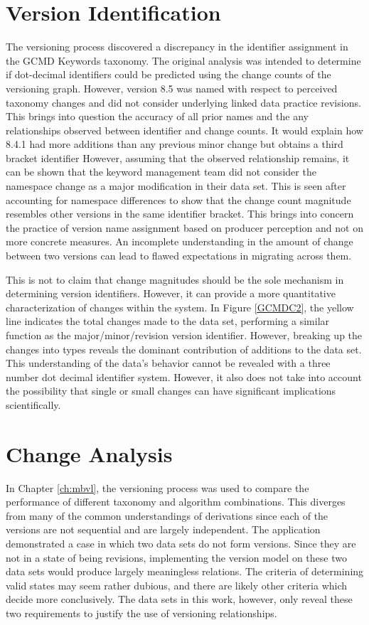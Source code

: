 \section{Version Identification}

The versioning process discovered a discrepancy in the identifier assignment in the GCMD Keywords taxonomy.
The original analysis was intended to determine if dot-decimal identifiers could be predicted using the change counts of the versioning graph.
However, version 8.5 was named with respect to perceived taxonomy changes and did not consider underlying linked data practice revisions.
This brings into question the accuracy of all prior names and the any relationships observed between identifier and change counts.
It would explain how 8.4.1 had more additions than any previous minor change but obtains a third bracket identifier
However, assuming that the observed relationship remains, it can be shown that the keyword management team did not consider the namespace change as a major modification in their data set.
This is seen after accounting for namespace differences to show that the change count magnitude resembles other versions in the same identifier bracket.
This brings into concern the practice of version name assignment based on producer perception and not on more concrete measures.
An incomplete understanding in the amount of change between two versions can lead to flawed expectations in migrating across them.

This is not to claim that change magnitudes should be the sole mechanism in determining version identifiers.
However, it can provide a more quantitative characterization of changes within the system.
In Figure \ref{GCMDC2}, the yellow line indicates the total changes made to the data set, performing a similar function as the major/minor/revision version identifier.
However, breaking up the changes into types reveals the dominant contribution of additions to the data set.
This understanding of the data's behavior cannot be revealed with a three number dot decimal identifier system.
However, it also does not take into account the possibility that single or small changes can have significant implications scientifically.

\section{Change Analysis}

In Chapter \ref{ch:mbvl}, the versioning process was used to compare the performance of different taxonomy and algorithm combinations.
This diverges from many of the common understandings of derivations since each of the versions are not sequential and are largely independent.
The application demonstrated a case in which two data sets do not form versions.
Since they are not in a state of being revisions, implementing the version model on these two data sets would produce largely meaningless relations.
The criteria of determining valid states may seem rather dubious, and there are likely other criteria which decide more conclusively.
The data sets in this work, however, only reveal these two requirements to justify the use of versioning relationships. 

